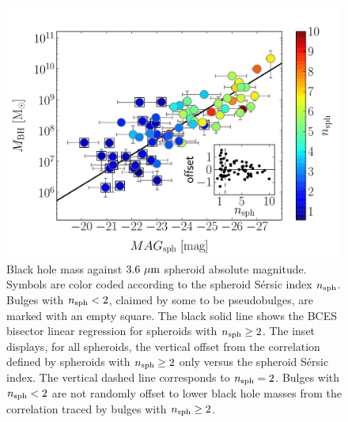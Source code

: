 \documentclass[preprint2]{emulateapj}
\begin{document}
\begin{figure}[h]
\begin{center}
\includegraphics[width=\columnwidth]{images/mbh_vs_mag_sph_psb.pdf}
\caption{Black hole mass against $3.6\rm~\mu m$ spheroid absolute magnitude. 
Symbols are color coded according to the spheroid S\'ersic index $n_{\rm sph}$. 
Bulges with $n_{\rm sph}<2$, claimed by some to be pseudobulges, are marked with an empty square. 
The black solid line shows the BCES bisector linear regression for spheroids with $n_{\rm sph} \geq 2$. 
The inset displays, for all spheroids, the vertical offset 
from the correlation defined by spheroids with $n_{\rm sph} \geq 2$ only 
versus the spheroid S\'ersic index. 
The vertical dashed line corresponds to $n_{\rm sph} = 2$.
Bulges with $n_{\rm sph}<2$ are not randomly offset to lower black hole masses 
from the correlation traced by bulges with $n_{\rm sph} \geq 2$.}
\label{fig:pseudob}
\end{center}
\end{figure}
\end{document}
